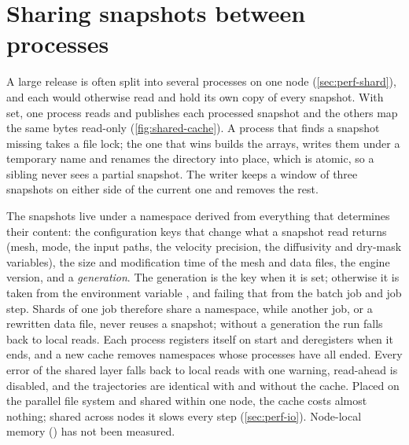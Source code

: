 \section{Sharing snapshots between processes}\label{sec:input-shared}

A large release is often split into several processes on one node (\cref{sec:perf-shard}), and each would
otherwise read and hold its own copy of every snapshot. With  set, one
process reads and publishes each processed snapshot and the others map the same bytes read-only
(\cref{fig:shared-cache}). A process that finds a snapshot missing takes a file lock; the one that wins
builds the arrays, writes them under a temporary name and renames the directory into place, which is atomic,
so a sibling never sees a partial snapshot. The writer keeps a window of three snapshots on either side of
the current one and removes the rest.

The snapshots live under a namespace derived from everything that determines their content: the
configuration keys that change what a snapshot read returns (mesh, mode, the input paths, the velocity
precision, the diffusivity and dry-mask variables), the size and modification time of the mesh and data files,
the engine version, and a \emph{generation}. The generation is the key
 when it is set; otherwise it is taken from the environment variable
, and failing that from the batch job and job step. Shards of one job therefore
share a namespace, while another job, or a rewritten data file, never reuses a snapshot; without a generation
the run falls back to local reads. Each process registers itself on start and deregisters when it ends, and a
new cache removes namespaces whose processes have all ended. Every error of the shared layer falls back to
local reads with one warning, read-ahead is disabled, and the trajectories are identical with and without the
cache. Placed on the parallel file system and shared within one node, the cache costs almost nothing; shared
across nodes it slows every step (\cref{sec:perf-io}). Node-local memory () has not been
measured.

